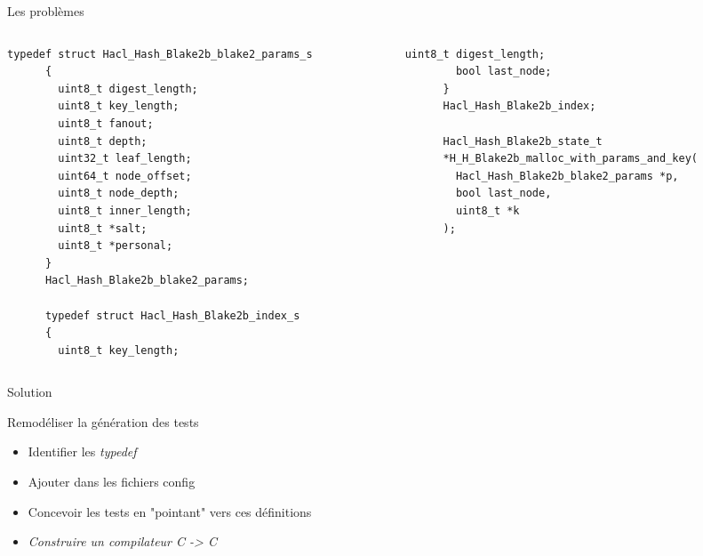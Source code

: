 \documentclass[A4,svgnames,9pt,aspectratio=169]{beamer}
\begin{document}

\begin{frame}[fragile]{Les problèmes}
  \begin{columns}
    \begin{column}{0.5\textwidth}
      \begin{lstlisting}[style=CStyle, gobble=6]
      typedef struct Hacl_Hash_Blake2b_blake2_params_s
      {
        uint8_t digest_length;
        uint8_t key_length;
        uint8_t fanout;
        uint8_t depth;
        uint32_t leaf_length;
        uint64_t node_offset;
        uint8_t node_depth;
        uint8_t inner_length;
        uint8_t *salt;
        uint8_t *personal;
      }
      Hacl_Hash_Blake2b_blake2_params;
    
      typedef struct Hacl_Hash_Blake2b_index_s
      {
        uint8_t key_length;
      \end{lstlisting}
      
    \end{column}
    \begin{column}{0.5\textwidth}
      \begin{lstlisting}[style=CStyle, caption={Hacl\_Hash\_Blake2b.h}, gobble=6]
        uint8_t digest_length;
        bool last_node;
      }
      Hacl_Hash_Blake2b_index;
    
      Hacl_Hash_Blake2b_state_t
      *H_H_Blake2b_malloc_with_params_and_key(
        Hacl_Hash_Blake2b_blake2_params *p,
        bool last_node,
        uint8_t *k
      );
    \end{lstlisting}
    \end{column}
  \end{columns}

\end{frame}

\begin{frame}{Solution}
  \begin{block}{Remodéliser la génération des tests}
    \begin{itemize}
      \item Identifier les \textit{typedef}
      \item Ajouter dans les fichiers config
      \item Concevoir les tests en "pointant" vers ces définitions
      \item \textit{Construire un compilateur C -> C}
    \end{itemize}
  \end{block}
\end{frame}
\end{document}
